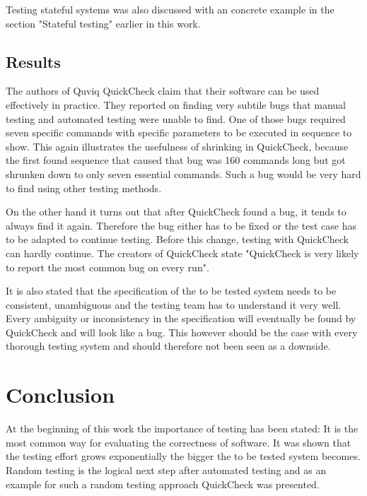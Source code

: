 \documentclass[a4paper, 12pt]{article} %
\begin{document}
Testing stateful systems was also discussed with an concrete example in the section "Stateful testing" earlier in this work.

\subsection{Results}

The authors of Quviq QuickCheck claim that their software can be used effectively in practice. They reported on finding very subtile bugs that manual testing and automated testing were unable to find. One of those bugs required seven specific commands with specific parameters to be executed in sequence to show. This again illustrates the usefulness of shrinking in QuickCheck, because the first found sequence that caused that bug was 160 commands long but got shrunken down to only seven essential commands. Such a bug would be very hard to find using other testing methods\cite{Arts06}.

On the other hand it turns out that after QuickCheck found a bug, it tends to always find it again. Therefore the bug either has to be fixed or the test case has to be adapted to continue testing. Before this change, testing with QuickCheck can hardly continue. The creators of QuickCheck state "QuickCheck is very likely to report the most common bug on every run"\cite{Arts06}.

It is also stated that the specification of the to be tested system needs to be consistent, unambiguous and the testing team has to understand it very well. Every ambiguity or inconsistency in the specification will eventually be found by QuickCheck and will look like a bug. This however should be the case with every thorough testing system and should therefore not been seen as a downside\cite{Arts06}.

\newpage
\section{Conclusion}


At the beginning of this work the importance of testing has been stated: It is the most common way for evaluating the correctness of software. It was shown that the testing effort grows exponentially the bigger the to be tested system becomes. Random testing is the logical next step after automated testing and as an example for such a random testing approach QuickCheck was presented.  
\end{document}
